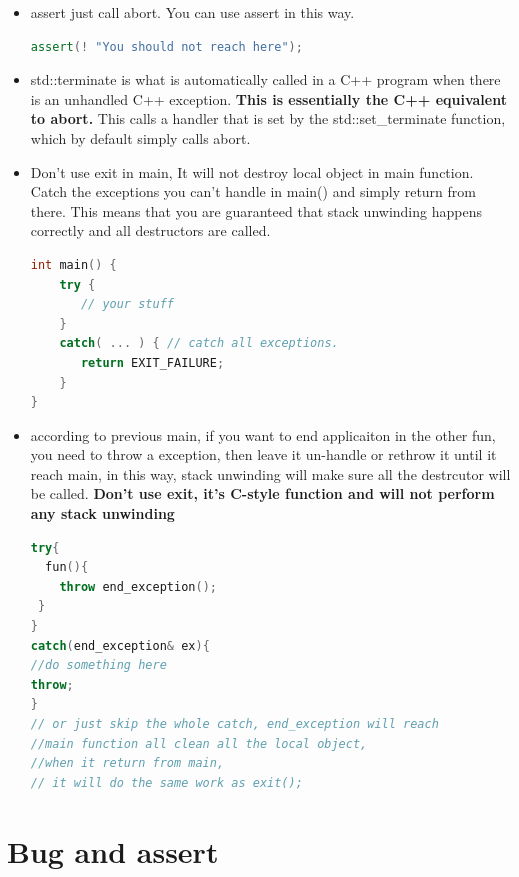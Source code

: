 \documentclass[a4paper,12pt,twoside]{book}
\begin{document}
\begin{itemize}
\item assert just call abort. You can use assert in this way.
\begin{lstlisting}[frame=single, language=c++]
assert(! "You should not reach here");
\end{lstlisting}

\item std::terminate is what is automatically called in a C++ program when there is an unhandled C++ exception. \textbf{This is essentially the C++ equivalent to abort.} This calls a handler that is set by the std::set\_terminate function, which by default simply calls abort.

\item Don't use exit in main, It will not destroy local object in main function. Catch the exceptions you can't handle in main() and simply return from there. This means that you are guaranteed that stack unwinding happens correctly and all destructors are called.
\begin{lstlisting}[frame=single, language=c++]
int main() {
    try {
       // your stuff
    }
    catch( ... ) { // catch all exceptions.
       return EXIT_FAILURE;
    }
}
\end{lstlisting}

\item according to previous main, if you want to end applicaiton in the other fun, you need to throw a exception, then leave it un-handle or rethrow it until it reach main, in this way, stack unwinding will make sure all the destrcutor will be called. \textbf{Don't use exit, it's C-style function and will not perform any stack unwinding}
\begin{lstlisting}[frame=single, language=c++]
try{
  fun(){
    throw end_exception();
 }
}
catch(end_exception& ex){
//do something here
throw;
}
// or just skip the whole catch, end_exception will reach
//main function all clean all the local object,
//when it return from main,
// it will do the same work as exit();
\end{lstlisting}

\end{itemize}


\section{Bug and assert}
\end{document}
